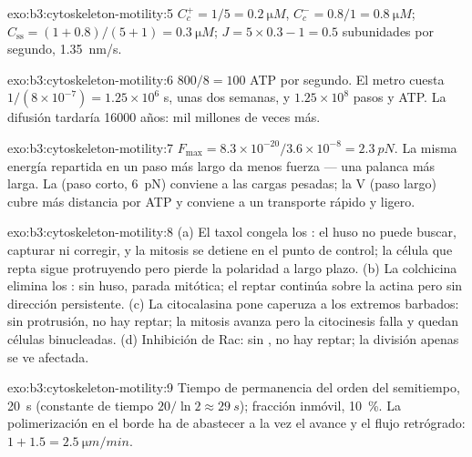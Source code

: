 \begin{solution}{exo:b3:cytoskeleton-motility:5}
$C_{c}^{+} = 1/5 = \qty{0.2}{\micro M}$, $C_{c}^{-} = 0.8/1 =
\qty{0.8}{\micro M}$; $C_{\text{ss}} = (1 + 0.8)/(5 + 1) = \qty{0.3}{\micro
M}$; $J = 5\times 0.3 - 1 = 0.5$ subunidades por segundo,
\qty{1.35}{nm/s}.
\end{solution}

\begin{solution}{exo:b3:cytoskeleton-motility:6}
$800/8 = 100$ ATP por segundo. El metro cuesta $1/(8\times 10^{-7}) =
1.25\times 10^{6}$ s, unas dos semanas, y $1.25\times 10^{8}$ pasos y
ATP. La difusión tardaría \num{16000} años: mil millones de veces más.
\end{solution}

\begin{solution}{exo:b3:cytoskeleton-motility:7}
$F_{\max} = 8.3\times 10^{-20}/3.6\times 10^{-8} = \qty{2.3}{pN}$. La
misma energía repartida en un paso más largo da menos fuerza --- una
palanca más larga. La  (paso corto, \qty{6}{pN}) conviene a las
cargas pesadas; la  V (paso largo) cubre más distancia por ATP y
conviene a un transporte rápido y ligero.
\end{solution}

\begin{solution}{exo:b3:cytoskeleton-motility:8}
(a) El taxol congela los : el huso no puede buscar, capturar
ni corregir, y la mitosis se detiene en el punto de control; la célula
que repta sigue protruyendo pero pierde la polaridad a largo plazo.
(b) La colchicina elimina los : sin huso, parada mitótica; el
reptar continúa sobre la actina pero sin dirección persistente. (c) La
citocalasina pone caperuza a los extremos barbados: sin protrusión, no
hay reptar; la mitosis avanza pero la citocinesis falla y quedan células
binucleadas. (d) Inhibición de Rac: sin , no hay reptar; la
división apenas se ve afectada.
\end{solution}

\begin{solution}{exo:b3:cytoskeleton-motility:9}
Tiempo de permanencia del orden del semitiempo, \qty{20}{s} (constante de
tiempo $20/\ln 2 \approx \qty{29}{s}$); fracción inmóvil, \qty{10}{\%}.
La polimerización en el borde ha de abastecer a la vez el avance y el
flujo retrógrado: $1 + 1.5 = \qty{2.5}{\micro m/min}$.
\end{solution}

